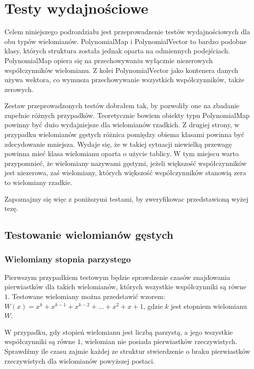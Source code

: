 \section{Testy wydajnościowe}

Celem niniejszego podrozdziału jest przeprowadzenie testów wydajnościowych dla obu typów wielomianów. PolynomialMap i PolynomialVector to bardzo podobne klasy, których struktura została jednak oparta na odmiennych podejściach. PolynomialMap opiera się na przechowywaniu wyłącznie niezerowych współczynników wielomianu. Z kolei PolynomialVector jako kontenera danych używa wektora, co wymusza przechowywanie wszystkich współczynników, także zerowych.

Zestaw przeprowadzonych testów dobrałem tak, by pozwoliły one na zbadanie zupełnie różnych przypadków. Teoretycznie bowiem obiekty typu PolynomialMap powinny być dużo wydajniejsze dla wielomianów rzadkich. Z drugiej strony, w przypadku wielomianów gęstych różnica pomiędzy obiema klasami powinna być zdecydowanie mniejsza. Wydaje się, że w takiej sytuacji niewielką przewagę powinna mieć klasa wielomianu oparta o użycie tablicy. W tym miejscu warto przypomnieć, że wielomiany nazywami gęstymi, jeżeli większość współczynników jest niezerowa, zaś wielomiany, których większość współczynników stanowią zera to wielomiany rzadkie.

Zapoznajmy się więc z poniższymi testami, by zweryfikowac przedstawioną wyżej tezę.

\subsection{Testowanie wielomianów gęstych}

\subsubsection{Wielomiany stopnia parzystego}

Pierwszym przypadkiem testowym będzie sprawdzenie czasów znajdowania pierwiastków dla takich wielomianów, których wszystkie współczynniki są równe $1$. Testowane wielomiany można przedstawić wzorem: \\
$W(x) = x^k + x^{k-1} + x^{k-2} + ... + x^2 + x + 1$, gdzie $k$ jest stopniem wielomianu $W$.

W przypadku, gdy stopień wielomianu jest liczbą parzystą, a jego wszystkie współczynniki są równe $1$, wielomian nie posiada pierwiastków rzeczywistych. Sprawdźmy ile czasu zajmie każdej ze struktur stwierdzenie o braku pierwiastków rzeczywistych dla wielomianów powyższej postaci.

